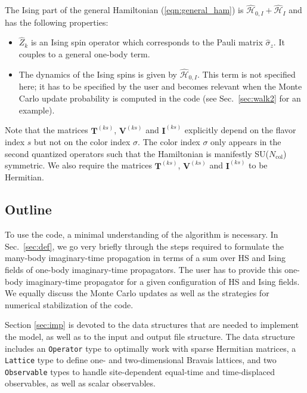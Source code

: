 The Ising part of the general Hamiltonian (\ref{eqn:general_ham}) is $\hat{\mathcal{H}}_{0,I}+ \hat{\mathcal{H}}_{I}$ and  has the following properties:
\begin{itemize}
\item $\hat{Z}_k$ is an Ising spin operator which corresponds to the Pauli matrix $\hat{\sigma}_{z}$. It couples to a general one-body term. 
\item  The dynamics of the Ising spins is given by $\hat{\mathcal{H}}_{0,I}$. This term is not specified here; 
it has to be specified by the user and becomes relevant when the Monte Carlo update probability is computed in the code (see Sec.~\ref{sec:walk2} for an example).
\end{itemize}
Note that the matrices  $\bm{T}^{(ks)}$,  $\bm{V}^{(ks)}$ and  $\bm{I}^{(ks)}$ explicitly depend on the flavor index $s$ but not on the color index $\sigma$. 
The color index $\sigma$ only appears in  the  second quantized operators such that the Hamiltonian is manifestly SU($N_{\mathrm{col}}$)    symmetric.  We also require
the matrices $\bm{T}^{(ks)}$,  $\bm{V}^{(ks)}$ and  $\bm{I}^{(ks)}$  to be  Hermitian.

\subsection{Outline}

To use the code, a minimal understanding of the algorithm is necessary. 
In Sec.~\ref{sec:def}, we go very briefly through  the steps required  to formulate the many-body imaginary-time propagation in terms of a sum  over HS and Ising fields  of one-body  imaginary-time propagators.   
The user has to provide this one-body imaginary-time propagator for a given configuration of   HS and  Ising fields. 
We equally discuss the Monte Carlo updates as well as the strategies for numerical stabilization of the code. 

Section \ref{sec:imp} is devoted to the data structures that are needed to implement the model, as well as to the input and output file structure.   
The data structure includes  an \texttt{Operator} type to  optimally work with sparse Hermitian matrices, a \texttt{Lattice} type  to define one- and two-dimensional Bravais lattices, and   two   \texttt{Observable} types to handle site-dependent equal-time and  time-displaced observables, as well as scalar observables. 

